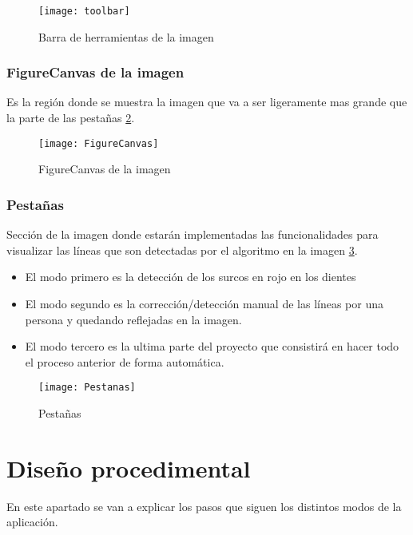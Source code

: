 \begin{figure}[h]
\centering
\texttt{[image: toolbar]}
\caption{Barra de herramientas de la imagen}\label{fig:5.11}
\end{figure}


\subsubsection{FigureCanvas de la imagen}
Es la región donde se muestra la imagen que va a ser ligeramente mas grande que la parte de las pestañas \ref{fig:5.12}.
\begin{figure}[h]
\centering
\texttt{[image: FigureCanvas]}
\caption{FigureCanvas de la imagen}
\label{fig:5.12}
\end{figure}


\subsubsection{Pestañas}
Sección de la imagen donde estarán implementadas las funcionalidades para visualizar las líneas que son detectadas por el algoritmo en la imagen \ref{fig:5.13}.
\begin{itemize}
\item El modo primero es la detección de los surcos en rojo en los dientes 
\item El modo segundo es la corrección/detección manual de las líneas por una persona y quedando reflejadas en la imagen.
\item El modo tercero es la ultima parte del proyecto que consistirá en hacer todo el proceso anterior de forma automática.
\end{itemize}

\begin{figure}[h]
\centering
\texttt{[image: Pestanas]}
\caption{Pestañas}
\label{fig:5.13}
\end{figure}

\section{Diseño procedimental}
En este apartado se van a explicar los pasos que siguen los distintos modos de la aplicación.

